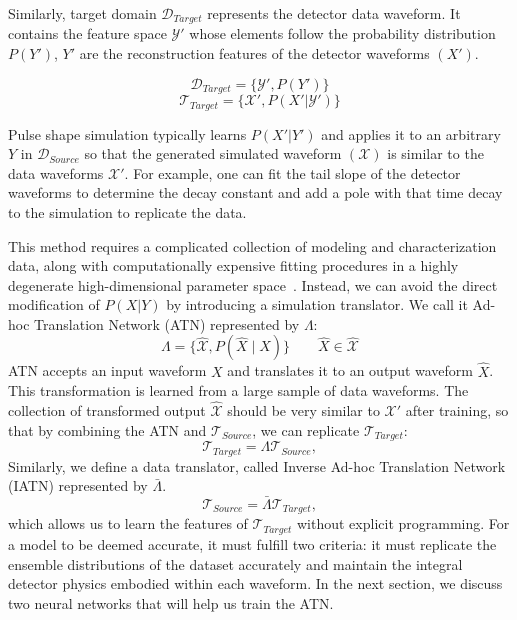 Similarly, target domain $\mathcal{D}_{Target}$ represents the detector data waveform. It contains the feature space $\mathcal{Y'}$ whose elements follow the probability distribution $P(Y')$, $Y'$ are the reconstruction features of the detector waveforms $(X')$.

\begin{equation}
\mathcal{D}_{Target}=\{\mathcal{Y}',P(Y')\}
\end{equation}
\begin{equation}
\mathcal{T}_{Target}=\{\mathcal{X}',P(X'|\mathcal{Y}')\}
\end{equation}

Pulse shape simulation typically learns $P(X'|Y')$ and applies it to an arbitrary $Y$ in $\mathcal{D}_{Source}$ so that the generated simulated waveform $(\mathcal{X})$ is similar to the data waveforms $\mathcal{X}'$. For example, one can fit the tail slope of the detector waveforms to determine the decay constant and add a pole with that time decay to the simulation to replicate the data. 

This method requires a complicated collection of modeling and characterization data, along with computationally expensive fitting procedures in a highly degenerate high-dimensional parameter space~\cite{Ben_Thesis,Sam_Thesis}. Instead, we can avoid the direct modification of $P(X|Y)$ by introducing a simulation translator. We call it Ad-hoc Translation Network (ATN) represented by $\Lambda$:
\begin{equation}
\Lambda = \{\hat{\mathcal{X}}, P(\hat{X}\mid X)\}\qquad \hat{X}\in \hat{\mathcal{X}}
\label{eqn:ATN}
\end{equation}
ATN accepts an input waveform $X$ and translates it to an output waveform $\hat{X}$. This transformation is learned from a large sample of data waveforms. The collection of transformed output $\hat{\mathcal{X}}$ should be very similar to $\mathcal{X}'$ after training, so that by combining the ATN and $\mathcal{T}_{Source}$, we can replicate $\mathcal{T}_{Target}$:
\begin{equation}
    \mathcal{T}_{Target}=\Lambda \mathcal{T}_{Source} ,
    \label{eqn:ATN_task}
\end{equation}
Similarly, we define a data translator, called Inverse Ad-hoc Translation Network (IATN) represented by $\bar{\Lambda}$.
\begin{equation}
    \mathcal{T}_{Source}= \bar{\Lambda} \mathcal{T}_{Target} ,
    \label{eqn:IATN_task}
\end{equation}
which allows us to learn the features of $\mathcal{T}_{Target}$ without explicit programming. For a model to be deemed accurate, it must fulfill two criteria: it must replicate the ensemble distributions of the dataset accurately and maintain the integral detector physics embodied within each waveform. In the next section, we discuss two neural networks that will help us train the ATN.


